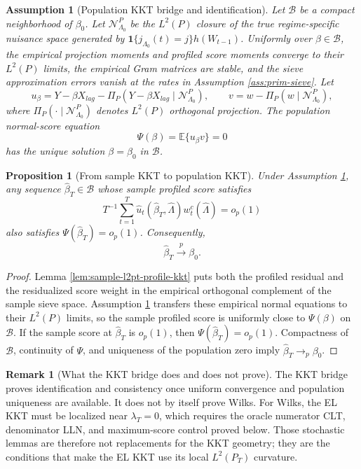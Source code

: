 \documentclass[12pt]{article}
\numberwithin{equation}{section}
\newtheorem{proposition}{Proposition}
\newtheorem{assumption}{Assumption}
\theoremstyle{definition}
\newtheorem{remark}{Remark}
\newcommand{\ind}{\mathbf 1}
\newcommand{\E}{\mathbb E}
\begin{document}
\begin{assumption}[Population KKT bridge and identification]
\label{ass:population-kkt-identification}
Let \(\mathcal B\) be a compact neighborhood of \(\beta_0\). Let
\(\mathcal N_{\Lambda_0}^{P}\) be the \(L^2(P)\) closure of the true
regime-specific nuisance space generated by
\(\ind\{j_{\Lambda_0}(t)=j\}h(W_{t-1})\). Uniformly over
\(\beta\in\mathcal B\), the empirical projection moments and profiled score
moments converge to their \(L^2(P)\) limits, the empirical Gram matrices are
stable, and the sieve approximation errors vanish at the rates in Assumption
\ref{ass:prim-sieve}. Let
\[
    u_\beta
    =
    Y-\beta X_{lag}
    -\Pi_P(Y-\beta X_{lag}\mid\mathcal N_{\Lambda_0}^{P}),
    \qquad
    v
    =
    w-\Pi_P(w\mid\mathcal N_{\Lambda_0}^{P}),
\]
where \(\Pi_P(\cdot\mid\mathcal N_{\Lambda_0}^{P})\) denotes \(L^2(P)\)
orthogonal projection. The population normal-score equation
\[
    \Psi(\beta)=\E\{u_\beta v\}=0
\]
has the unique solution \(\beta=\beta_0\) in \(\mathcal B\).
\end{assumption}

\begin{proposition}[From sample KKT to population KKT]
\label{prop:sample-to-population-kkt}
Under Assumption \ref{ass:population-kkt-identification}, any sequence
\(\widehat\beta_T\in\mathcal B\) whose sample profiled score satisfies
\[
    T^{-1}\sum_{t=1}^T
    \widehat u_t(\widehat\beta_T,\widehat\Lambda)
    w_t^c(\widehat\Lambda)
    =o_p(1)
\]
also satisfies \(\Psi(\widehat\beta_T)=o_p(1)\). Consequently,
\[
    \widehat\beta_T\overset{p}{\longrightarrow}\beta_0.
\]
\end{proposition}

\begin{proof}
Lemma \ref{lem:sample-l2pt-profile-kkt} puts both the profiled residual and
the residualized score weight in the empirical orthogonal complement of the
sample sieve space. Assumption \ref{ass:population-kkt-identification}
transfers these empirical normal equations to their \(L^2(P)\) limits, so the
sample profiled score is uniformly close to \(\Psi(\beta)\) on \(\mathcal B\).
If the sample score at \(\widehat\beta_T\) is \(o_p(1)\), then
\(\Psi(\widehat\beta_T)=o_p(1)\). Compactness of \(\mathcal B\), continuity of
\(\Psi\), and uniqueness of the population zero imply
\(\widehat\beta_T\to_p\beta_0\).
\end{proof}

\begin{remark}[What the KKT bridge does and does not prove]
The KKT bridge proves identification and consistency once uniform convergence
and population uniqueness are available. It does not by itself prove Wilks.
For Wilks, the EL KKT must be localized near \(\lambda_T=0\), which requires
the oracle numerator CLT, denominator LLN, and maximum-score control proved
below. Those stochastic lemmas are therefore not replacements for the KKT
geometry; they are the conditions that make the EL KKT use its local
\(L^2(P_T)\) curvature.
\end{remark}
\end{document}
